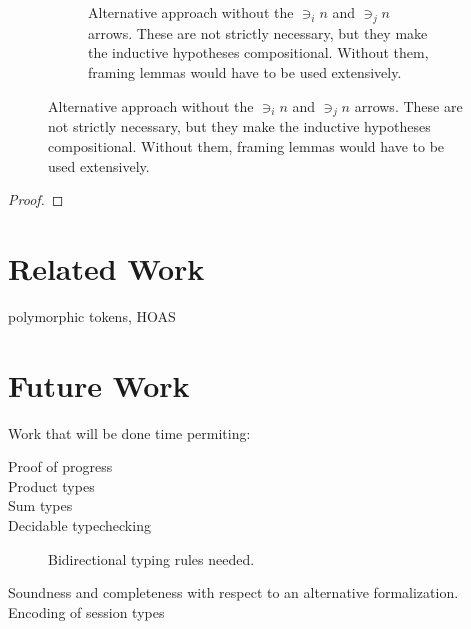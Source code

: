 \documentclass[a4paper,UKenglish,cleveref, autoref, thm-restate,authorcolumns]{lipics-v2019}
\theoremstyle{definition}
\begin{document}
\begin{figure}[h]
\begin{subfigure}{.4\textwidth}
    \caption{
      Alternative approach without the $\ni_i n$ and $\ni_j n$ arrows.
      These are not strictly necessary, but they make the inductive hypotheses compositional.
      Without them, framing lemmas would have to be used extensively.
    }
    \label{fig:subst-compositionality}
  \end{subfigure}
\end{figure}

\begin{proof}
\end{proof}

\section{Related Work}

\cite{previous-work} polymorphic tokens, HOAS

\cite{typing-with-leftovers}

\cite{Higher-inductive-types-for-congruence}

\cite{LTS-semantics}

\cite{work-on-session-types}


\section{Future Work}

Work that will be done time permiting:

\begin{description}

\item [Proof of progress]

\item [Product types]

\item [Sum types]

\item [Decidable typechecking]

  Bidirectional typing rules needed.

\item [Soundness and completeness with respect to an alternative formalization.]

\item [Encoding of session types]

\end{description}



\end{document}

